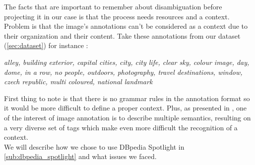 The facts that are important to remember about disambiguation before projecting it in our case is that the process needs resources and a context. Problem is that the image's annotations can't be considered as a context due to their organization and their content. Take these annotations from our dataset (\ref{sec:dataset}) for instance :
\begin{center}
	\textit{alley, building exterior, capital cities, city, city life, clear sky, colour image, day, dome, in a row, no people, outdoors, photography, travel destinations, window, czech republic, multi coloured, national landmark}
\end{center}
First thing to note is that there is no grammar rules in the annotation format so it would be more difficult to define a proper context. Plus, as presented in \cite{qian2014social}, one of the interest of image annotation is to describe multiple semantics, resulting on a very diverse set of tags which make even more difficult the recognition of a context.\\
We will describe how we chose to use DBpedia Spotlight in \ref{sub:dbpedia_spotlight} and what issues we faced. 
